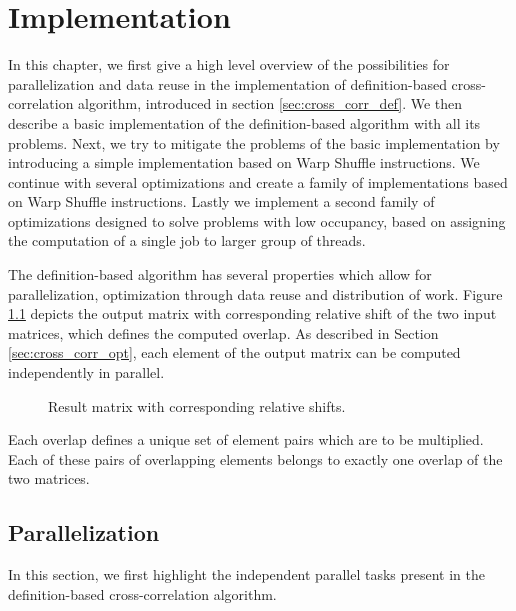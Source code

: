 \chapter{Implementation}
\label{sec:implementation}

In this chapter, we first give a high level overview of the possibilities for parallelization and data reuse in the implementation of definition-based cross-correlation algorithm, introduced in section \ref{sec:cross_corr_def}. We then describe a basic implementation of the definition-based algorithm with all its problems. Next, we try to mitigate the problems of the basic implementation by introducing a simple implementation based on Warp Shuffle instructions. We continue with several optimizations and create a family of implementations based on Warp Shuffle instructions. Lastly we implement a second family of optimizations designed to solve problems with low occupancy, based on assigning the computation of a single job to larger group of threads.


The definition-based algorithm has several properties which allow for parallelization, optimization through data reuse and distribution of work. Figure \ref{fig:cross_corr_shifts} depicts the output matrix with corresponding relative shift of the two input matrices, which defines the computed overlap. As described in Section \ref{sec:cross_corr_opt}, each element of the output matrix can be computed independently in parallel.

\begin{figure}[ht]
	\fontsize{6}{8}\selectfont
	\centering
	\def\svgwidth{0.55\textwidth}
	
	\caption{Result matrix with corresponding relative shifts.}
	\label{fig:cross_corr_shifts}
\end{figure}

Each overlap defines a unique set of element pairs which are to be multiplied. Each of these pairs of overlapping elements belongs to exactly one overlap of the two matrices.


\section{Parallelization}
\label{sec:implementation_parallelism}
In this section, we first highlight the independent parallel tasks present in the definition-based cross-correlation algorithm.  

